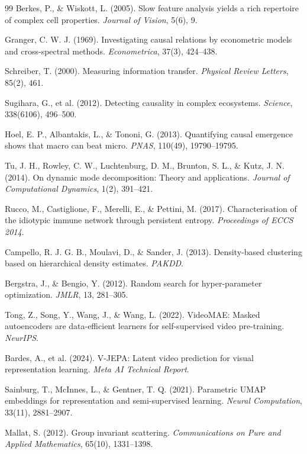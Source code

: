 \documentclass[11pt,a4paper]{article}
\begin{document}
\begin{thebibliography}{99}
Berkes, P., \& Wiskott, L. (2005). Slow feature analysis yields a
rich repertoire of complex cell properties. \emph{Journal of Vision},
5(6), 9.

Granger, C. W. J. (1969). Investigating causal relations by
econometric models and cross-spectral methods. \emph{Econometrica},
37(3), 424--438.

Schreiber, T. (2000). Measuring information transfer.
\emph{Physical Review Letters}, 85(2), 461.

Sugihara, G., et al. (2012). Detecting causality in complex
ecosystems. \emph{Science}, 338(6106), 496--500.

Hoel, E. P., Albantakis, L., \& Tononi, G. (2013). Quantifying causal
emergence shows that macro can beat micro. \emph{PNAS}, 110(49),
19790--19795.

Tu, J. H., Rowley, C. W., Luchtenburg, D. M., Brunton, S. L., \&
Kutz, J. N. (2014). On dynamic mode decomposition: Theory and
applications. \emph{Journal of Computational Dynamics}, 1(2),
391--421.

Rucco, M., Castiglione, F., Merelli, E., \& Pettini, M. (2017).
Characterisation of the idiotypic immune network through persistent
entropy. \emph{Proceedings of ECCS 2014}.

Campello, R. J. G. B., Moulavi, D., \& Sander, J. (2013). Density-based
clustering based on hierarchical density estimates. \emph{PAKDD}.

Bergstra, J., \& Bengio, Y. (2012). Random search for hyper-parameter
optimization. \emph{JMLR}, 13, 281--305.

Tong, Z., Song, Y., Wang, J., \& Wang, L. (2022). VideoMAE: Masked
autoencoders are data-efficient learners for self-supervised video
pre-training. \emph{NeurIPS}.

Bardes, A., et al. (2024). V-JEPA: Latent video prediction for visual
representation learning. \emph{Meta AI Technical Report}.

Sainburg, T., McInnes, L., \& Gentner, T. Q. (2021). Parametric UMAP
embeddings for representation and semi-supervised learning.
\emph{Neural Computation}, 33(11), 2881--2907.

Mallat, S. (2012). Group invariant scattering. \emph{Communications
on Pure and Applied Mathematics}, 65(10), 1331--1398.


\end{thebibliography}
\end{document}
